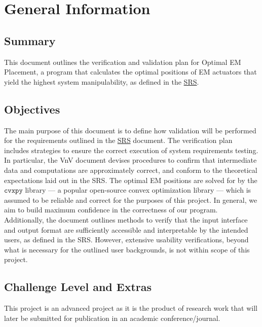 \documentclass[12pt, titlepage]{article}
\begin{document}
\section{General Information} \label{gen_info}

\subsection{Summary}
This document outlines the verification and validation plan for Optimal EM Placement, a program that calculates the optimal positions of EM actuators that yield the highest system manipulability, as defined in the \href{https://github.com/husseinsd1/optimal-em-arrangement/blob/main/docs/SRS/SRS.pdf}{SRS}. 

\subsection{Objectives}
The main purpose of this document is to define how validation will be performed for the requirements outlined in the \href{https://github.com/husseinsd1/optimal-em-arrangement/blob/main/docs/SRS/SRS.pdf}{SRS} document. The verification plan includes strategies to ensure the correct execution of system requirements testing. In particular, the VnV document devises procedures to confirm that intermediate data and computations are approximately correct, and conform to the theoretical expectations laid out in the SRS. The optimal EM positions are solved for by the \href{https://www.cvxpy.org/}{$\texttt{cvxpy}$} library --- a popular open-source convex optimization library --- which is assumed to be reliable and correct for the purposes of this project. In general, we aim to build maximum confidence in the correctness of our program. Additionally, the document outlines methods to verify that the input interface and output format are sufficiently accessible and interpretable by the intended users, as defined in the SRS. However, extensive usability verifications, beyond what is necessary for the outlined user backgrounds, is not within scope of this project.

\subsection{Challenge Level and Extras}
This project is an advanced project as it is the product of research work that will later be submitted for publication in an academic conference/journal.  
\end{document}
